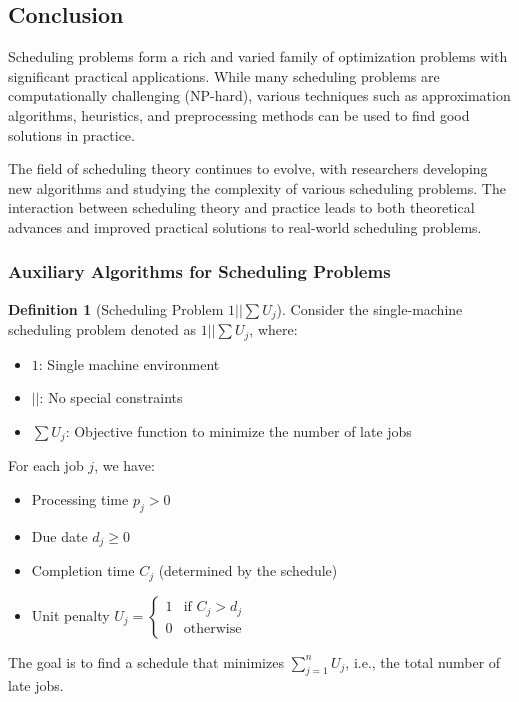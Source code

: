 \documentclass{article}
\theoremstyle{definition}
\newtheorem{definition}{Definition}
\begin{document}
\subsection*{Conclusion}

Scheduling problems form a rich and varied family of optimization problems with significant practical applications. While many scheduling problems are computationally challenging (NP-hard), various techniques such as approximation algorithms, heuristics, and preprocessing methods can be used to find good solutions in practice.

The field of scheduling theory continues to evolve, with researchers developing new algorithms and studying the complexity of various scheduling problems. The interaction between scheduling theory and practice leads to both theoretical advances and improved practical solutions to real-world scheduling problems.

\subsubsection{Auxiliary Algorithms for Scheduling Problems}

\begin{definition}[Scheduling Problem $1||\sum U_j$]
Consider the single-machine scheduling problem denoted as $1||\sum U_j$, where:
\begin{itemize}
    \item $1$: Single machine environment
    \item $||$: No special constraints
    \item $\sum U_j$: Objective function to minimize the number of late jobs
\end{itemize}

For each job $j$, we have:
\begin{itemize}
    \item Processing time $p_j > 0$
    \item Due date $d_j \geq 0$
    \item Completion time $C_j$ (determined by the schedule)
    \item Unit penalty $U_j = 
    \begin{cases} 
        1 & \text{if } C_j > d_j \\ 
        0 & \text{otherwise} 
    \end{cases}$
\end{itemize}

The goal is to find a schedule that minimizes $\sum_{j=1}^{n} U_j$, i.e., the total number of late jobs.
\end{definition}
\end{document}
